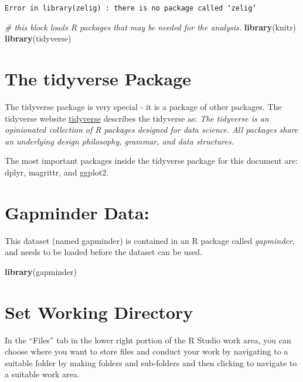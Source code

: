 \documentclass[]{book}
\newenvironment{Shaded}{\begin{snugshade}}{\end{snugshade}}
\newcommand{\KeywordTok}[1]{\textcolor[rgb]{0.13,0.29,0.53}{\textbf{#1}}}
\newcommand{\CommentTok}[1]{\textcolor[rgb]{0.56,0.35,0.01}{\textit{#1}}}
\newcommand{\NormalTok}[1]{#1}
\begin{document}
\texttt{Error\ in\ library(zelig)\ :\ there\ is\ no\ package\ called\ ‘zelig’}

\begin{Shaded}
\begin{Highlighting}[]
\CommentTok{# this block loads R packages that may be needed for the analysis.}
\KeywordTok{library}\NormalTok{(knitr)}
\KeywordTok{library}\NormalTok{(tidyverse)}
\end{Highlighting}
\end{Shaded}

\section{The tidyverse Package}\label{the-tidyverse-package}

The tidyverse package is very special - it is a package of other
packages. The tidyverse website \href{http://tidyverse.org}{tidyverse}
describes the tidyverse as: \emph{The tidyverse is an opinionated
collection of R packages designed for data science. All packages share
an underlying design philosophy, grammar, and data structures.}

The most important packages inside the tidyverse package for this
document are: dplyr, magrittr, and ggplot2.

\section{Gapminder Data:}\label{gapminder-data}

This dataset (named gapminder) is contained in an R package called
\emph{gapminder}, and needs to be loaded before the dataset can be used.

\begin{Shaded}
\begin{Highlighting}[]
\KeywordTok{library}\NormalTok{(gapminder)}
\end{Highlighting}
\end{Shaded}

\section{Set Working Directory}\label{set-working-directory}

In the ``Files'' tab in the lower right portion of the R Studio work
area, you can choose where you want to store files and conduct your work
by navigating to a suitable folder by making folders and sub-folders and
then clicking to navigate to a suitable work area.
\end{document}
